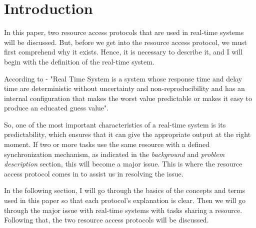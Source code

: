 \section{Introduction}

In this paper, two resource access protocols that are  used in real-time systems will be discussed. But, before we get into the resource access protocol, we must first comprehend why it exists. Hence, it is necessary to describe it, and I will begin with the definition of the real-time system.\par 

According to \cite{b1} - "Real Time System is a system whose response time and delay time are deterministic without uncertainty and non-reproducibility and has an internal configuration that makes the worst value predictable or makes it easy to produce an educated guess value".\par

So, one of the most important characteristics of a real-time system is its predictability, which ensures that it can give the appropriate output at the right moment. If two or more tasks use the same resource with a defined synchronization mechanism, as indicated in the \textit{background} and \textit{problem description} section, this will become a major issue. This is where the resource access protocol comes in to assist us in resolving the issue. \par

In the following section, I will go through the basics of the concepts and terms used in this paper so that each protocol's explanation is clear. Then we will go through the major issue with real-time systems with tasks sharing a resource. Following that, the two resource access protocols will be discussed.\par
 





